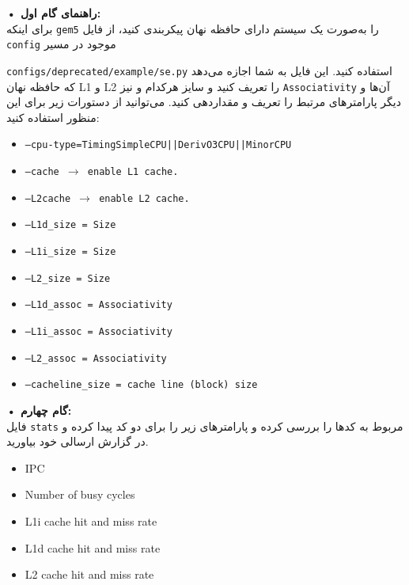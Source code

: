 \documentclass[12pt]{exam}
\begin{document}
\textbf{• راهنمای گام اول: }\\
برای اینکه \texttt{gem5} را به‌صورت یک سیستم دارای حافظه نهان پیکربندی کنید، از فایل \texttt{config} موجود در مسیر

\texttt{configs/deprecated/example/se.py} استفاده کنید. این فایل به شما اجازه می‌دهد که حافظه نهان L1 و L2 را تعریف کنید و سایز هرکدام و نیز \texttt{Associativity} آن‌ها و دیگر پارامتر‌های مرتبط را تعریف و مقدار‌دهی کنید. می‌توانید از دستورات زیر برای این منظور استفاده کنید:

\begin{latin}
	\begin{itemize}
		\item \texttt{--cpu-type={TimingSimpleCPU||DerivO3CPU||MinorCPU}}
		\item \texttt{--cache $\rightarrow$ enable L1 cache.}
		\item \texttt{--L2cache $\rightarrow$ enable L2 cache.}
		\item \texttt{--L1d\_size = Size}
		\item \texttt{--L1i\_size = Size}
		\item \texttt{--L2\_size = Size}
		\item \texttt{--L1d\_assoc = Associativity}
		\item \texttt{--L1i\_assoc = Associativity}
		\item \texttt{--L2\_assoc = Associativity}
		\item \texttt{--cacheline\_size = cache line (block) size}
	\end{itemize}
\end{latin}
 
 
 
 
 
 
 
 
 
 
\textbf{• گام چهارم: }\\
فایل \texttt{stats} مربوط به کد‌ها را بررسی کرده و پارامتر‌های زیر را برای دو کد پیدا کرده و در گزارش ارسالی خود بیاورید.
\begin{latin}
	\begin{itemize}
		\item IPC
		\item Number of busy cycles
		\item L1i cache hit and miss rate
		\item L1d cache hit and miss rate
		\item L2 cache hit and miss rate
	\end{itemize}
\end{latin}
\end{document}
